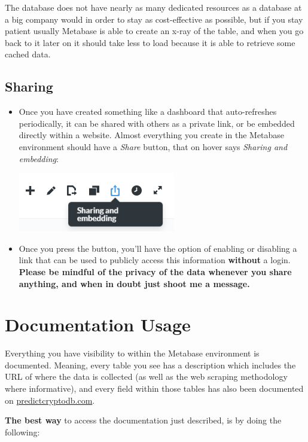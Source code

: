 \documentclass[
]{book}
\begin{document}
The database does not have nearly as many dedicated resources as a database at a big company would in order to stay as cost-effective as possible, but if you stay patient usually Metabase is able to create an x-ray of the table, and when you go back to it later on it should take less to load because it is able to retrieve some cached data.

\hypertarget{sharing}{%
\section{Sharing}\label{sharing}}

\begin{itemize}
\item
  Once you have created something like a dashboard that auto-refreshes periodically, it can be shared with others as a private link, or be embedded directly within a website. Almost everything you create in the Metabase environment should have a \emph{Share} button, that on hover says \emph{Sharing and embedding}:

  \includegraphics{images/SharingAndEmbedding.png}
\item
  Once you press the button, you'll have the option of enabling or disabling a link that can be used to publicly access this information \textbf{without} a login. \textbf{Please be mindful of the privacy of the data whenever you share anything, and when in doubt just shoot me a message.}
\end{itemize}

\hypertarget{documentation-usage}{%
\chapter{Documentation Usage}\label{documentation-usage}}

Everything you have visibility to within the Metabase environment is documented. Meaning, every table you see has a description which includes the URL of where the data is collected (as well as the web scraping methodology where informative), and every field within those tables has also been documented on \href{https://predictcryptodb.com}{predictcryptodb.com}.

\textbf{The best way} to access the documentation just described, is by doing the following:
\end{document}

